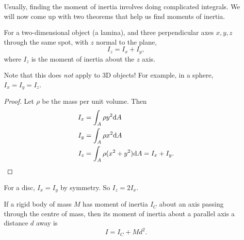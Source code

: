 Usually, finding the moment of inertia involves doing complicated integrals. We will now come up with two theorems that help us find moments of inertia.
\begin{theorem}
  For a two-dimensional object (a lamina), and three perpendicular axes $x, y, z$ through the same spot, with $z$ normal to the plane,
  \[
    I_z = I_x + I_y,
  \]
  where $I_z$ is the moment of inertia about the $z$ axis.
  \begin{center}
  \end{center}
\end{theorem}
Note that this does \emph{not} apply to 3D objects! For example, in a sphere, $I_x = I_y = I_z$.

\begin{proof}
  Let $\rho$ be the mass per unit volume. Then
  \begin{align*}
    I_x &= \int_A \rho y^2 \dd A\\
    I_y &= \int_A \rho x^2 \dd A\\
    I_z &= \int_A \rho (x^2 + y^2)\dd A = I_x + I_y.\qedhere
  \end{align*}
\end{proof}
\begin{example}
  For a disc, $I_x = I_y$ by symmetry. So $I_z = 2 I_x$.
\end{example}

\begin{theorem}
  If a rigid body of mass $M$ has moment of inertia $I_C$ about an axis passing through the centre of mass, then its moment of inertia about a parallel axis a distance $d$ away is
  \[
    I = I_C + Md^2.
  \]
  \begin{center}
  \end{center}
\end{theorem}

